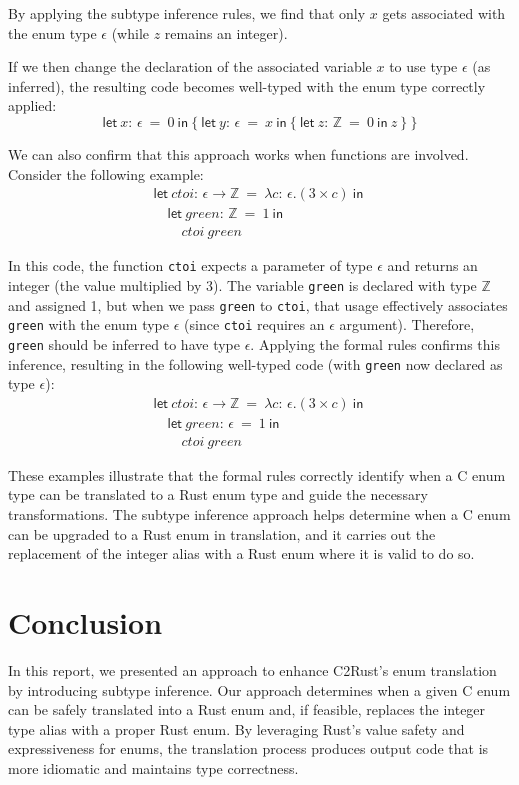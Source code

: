 \documentclass[10pt,conference]{IEEEtran}
\newcommand{\Z}{\ensuremath{\mathbb{Z}}}
\newcommand{\lett}[4]{\ensuremath{\mathsf{let}\ #1\mathsf{:}\,#2\ \mathsf{=}\ #3\ \mathsf{in}\ #4}}
\newcommand{\funct}[3]{\ensuremath{\lambda #1\mathsf{:}\,#2.#3}}
\newcommand{\apply}[2]{\ensuremath{#1\ #2}}
\newcommand{\arrowt}[2]{\ensuremath{{#1}\rightarrow{#2}}}
\begin{document}
By applying the subtype inference rules, we find that only $x$ gets associated with the enum type $\epsilon$ (while $z$ remains an integer).

If we then change the declaration of the associated variable $x$ to use type $\epsilon$ (as inferred), the resulting code becomes well-typed with the enum type correctly applied:
\[
\lett{x}{\epsilon}{0}{
    \{\ \lett{y}{\epsilon}{x}{\{\ 
        \lett{z}{\Z}{0}{z}
    \ \}}\ \}
}\]

We can also confirm that this approach works when functions are involved. Consider the following example:
\[
\begin{array}{l}
    \lett{ctoi}{\arrowt{\epsilon}{\Z}}{\funct{c}{\epsilon}{(3\times c)}}{}\\
    \quad \lett{green}{\Z}{1}{} \\
    \quad \quad \apply{ctoi}{green}
\end{array}
\]

In this code, the function \texttt{ctoi} expects a parameter of type $\epsilon$ and returns an integer (the value multiplied by 3). The variable \texttt{green} is declared with type $\Z$ and assigned 1, but when we pass \texttt{green} to \texttt{ctoi}, that usage effectively associates \texttt{green} with the enum type $\epsilon$ (since \texttt{ctoi} requires an $\epsilon$ argument). Therefore, \texttt{green} should be inferred to have type $\epsilon$. Applying the formal rules confirms this inference, resulting in the following well-typed code (with \texttt{green} now declared as type $\epsilon$):
\[
\begin{array}{l}
    \lett{ctoi}{\arrowt{\epsilon}{\Z}}{\funct{c}{\epsilon}{(3\times c)}}{}\\
    \quad \lett{green}{\epsilon}{1}{} \\
    \quad \quad \apply{ctoi}{green}
\end{array}
\]

These examples illustrate that the formal rules correctly identify when a C enum type can be translated to a Rust enum type and guide the necessary transformations. The subtype inference approach helps determine when a C enum can be upgraded to a Rust enum in translation, and it carries out the replacement of the integer alias with a Rust enum where it is valid to do so.

\section{Conclusion}
In this report, we presented an approach to enhance C2Rust's enum translation by introducing subtype inference. Our approach determines when a given C enum can be safely translated into a Rust enum and, if feasible, replaces the integer type alias with a proper Rust enum. By leveraging Rust's value safety and expressiveness for enums, the translation process produces output code that is more idiomatic and maintains type correctness.
\end{document}
